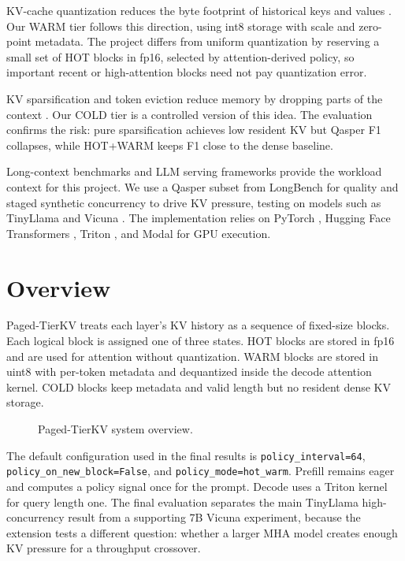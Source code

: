 \documentclass{article}
\begin{document}
KV-cache quantization reduces the byte footprint of historical keys and values \citep{liu2023kivi, pmlr-v202-sheng23a}. Our WARM tier follows this direction, using int8 storage with scale and zero-point metadata. The project differs from uniform quantization by reserving a small set of HOT blocks in fp16, selected by attention-derived policy, so important recent or high-attention blocks need not pay quantization error.

KV sparsification and token eviction reduce memory by dropping parts of the context \citep{zhang2023h2o, xiao2023efficient}. Our COLD tier is a controlled version of this idea. The evaluation confirms the risk: pure sparsification achieves low resident KV but Qasper F1 collapses, while HOT+WARM keeps F1 close to the dense baseline.

Long-context benchmarks and LLM serving frameworks provide the workload context for this project. We use a Qasper subset from LongBench \citep{bai-etal-2024-longbench} for quality and staged synthetic concurrency to drive KV pressure, testing on models such as TinyLlama \citep{zhang2024tinyllama} and Vicuna \citep{vicuna2023}. The implementation relies on PyTorch \citep{paszke2019pytorch}, Hugging Face Transformers \citep{wolf2020transformers}, Triton \citep{tillet2019triton}, and Modal \citep{modal2024} for GPU execution.

\section{Overview}

Paged-TierKV treats each layer's KV history as a sequence of fixed-size blocks. Each logical block is assigned one of three states. HOT blocks are stored in fp16 and are used for attention without quantization. WARM blocks are stored in uint8 with per-token metadata and dequantized inside the decode attention kernel. COLD blocks keep metadata and valid length but no resident dense KV storage.

\begin{figure}[hbtp]
\begin{center}
\resizebox{\linewidth}{!}{}
\end{center}
\caption{Paged-TierKV system overview.}
\label{fig:overview}
\end{figure}

The default configuration used in the final results is \texttt{policy\_interval=64}, \texttt{policy\_on\_new\_block=False}, and \texttt{policy\_mode=hot\_warm}. Prefill remains eager and computes a policy signal once for the prompt. Decode uses a Triton kernel for query length one. The final evaluation separates the main TinyLlama high-concurrency result from a supporting 7B Vicuna experiment, because the extension tests a different question: whether a larger MHA model creates enough KV pressure for a throughput crossover.
\end{document}

